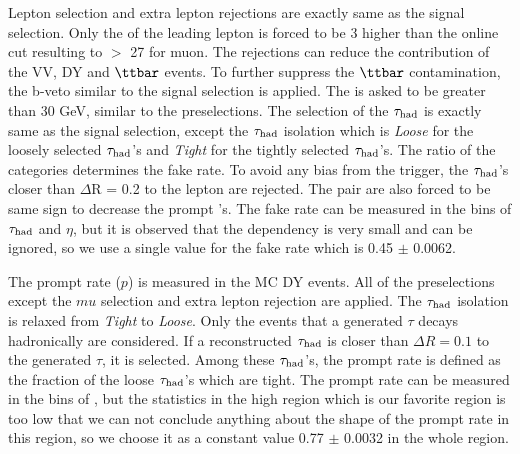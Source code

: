 Lepton selection and extra lepton rejections are exactly same as the signal selection. Only the \pt of the %
leading lepton is forced to 
be 3 \GeV higher than the online cut resulting to \pt $>$ 27 \GeV for muon.%
The rejections can reduce the contribution of the VV, DY and $\ttbar$ events. To further suppress the $\ttbar$ contamination, the b-veto 
similar to the signal selection is applied. The \MET is asked to be greater than 30 GeV, similar to the preselections. The selection of the $\tau_{\rm had}$ is exactly same as the signal selection, except the $\tau_{\rm had}$ isolation which is {\it Loose} for the loosely selected $\tau_{\rm had}$'s and {\it Tight} for the tightly selected $\tau_{\rm had}$'s. 
The ratio of the  categories determines the fake rate. To avoid any bias from the trigger, the $\tau_{\rm had}$'s closer than $\Delta$R = 0.2 to the 
lepton are rejected. The \muTau pair are also forced to be same sign to decrease the prompt \Tau's.
The fake rate can be measured in the bins of $\tau_{\rm had}$ \pt and $\eta$, but it is observed that the dependency is very small and can be ignored, 
so we use a single value for the fake rate which is 0.45 $\pm$ 0.0062.

The prompt rate ($p$) is measured in the MC DY events. All of the preselections except the $mu$ selection and extra lepton rejection %
are applied. 
The $\tau_{\rm had}$ isolation 
is relaxed from {\it Tight} to {\it Loose}. Only the events that a generated $\tau$ decays hadronically are considered. If a reconstructed $\tau_{\rm had}$ is 
closer than $\Delta R = 0.1$ to the generated $\tau$, it is selected. Among these $\tau_{\rm had}$'s, the prompt rate is defined as the fraction of the loose $\tau_{\rm had}$'s 
which are tight. The prompt rate can be measured in the bins of \mttwo, but the statistics in the high \mttwo region which is our favorite 
region is too low that we can not conclude anything about the shape of the prompt rate in this region, so we choose it as a constant value
0.77 $\pm$ 0.0032 in the whole \mttwo region.

